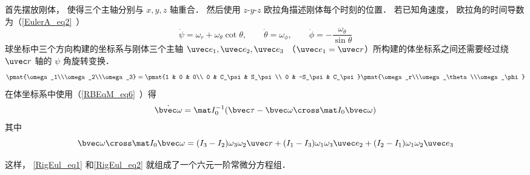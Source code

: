 
\begin{issues}
\issueDraft
\end{issues}


首先摆放刚体， 使得三个主轴分别与 $x,y,z$ 轴重合． 然后使用 $z$-$y$-$z$ 欧拉角描述刚体每个时刻的位置． 若已知角速度， 欧拉角的时间导数为（\autoref{EulerA_eq2}~）
\begin{equation}\label{RigEul_eq1}
\dot\psi = \omega_r + \omega_\theta \cot\theta,\qquad
\dot\theta = \omega_\phi,\qquad
\dot\phi = -\frac{\omega_\theta}{\sin\theta}
\end{equation}
球坐标中三个方向构建的坐标系与刚体三个主轴 $\uvec e_1, \uvec e_2, \uvec e_3$ （$\uvec e_1 = \uvec r$）所构建的体坐标系之间还需要经过绕 $\uvec r$ 轴的 $\psi$ 角旋转变换．
\begin{equation}
\pmat{\omega_1\\\omega_2\\\omega_3} = \pmat{1 & 0 & 0\\ 0 & C_\psi & S_\psi\\ 0 & -S_\psi & C_\psi}\pmat{\omega_r\\\omega_\theta\\\omega_\phi}
\end{equation}
在体坐标系中使用（\autoref{RBEqM_eq6}~）得
\begin{equation}\label{RigEul_eq2}
\dot{\bvec \omega} = \mat I_0^{-1} (\bvec \tau  - \bvec\omega\cross \mat I_0 \bvec\omega)
\end{equation}
其中
\begin{equation}
\bvec\omega\cross \mat I_0 \bvec\omega = (I_3-I_2)\omega_3\omega_2\uvec r + (I_1-I_3)\omega_1\omega_3\uvec e_2 + (I_2-I_1)\omega_1\omega_2\uvec e_3
\end{equation}

这样， \autoref{RigEul_eq1} 和\autoref{RigEul_eq2} 就组成了一个六元一阶常微分方程组．
